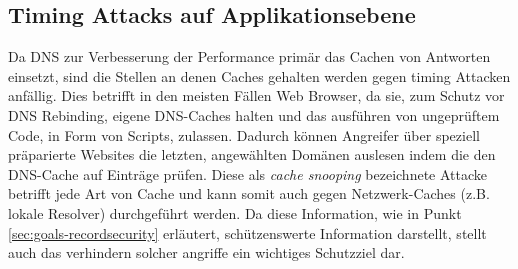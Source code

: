 \subsection{Timing Attacks auf Applikationsebene}
Da DNS zur Verbesserung der Performance primär das Cachen von Antworten einsetzt, sind die Stellen an denen Caches gehalten werden gegen timing Attacken anfällig. Dies betrifft in den meisten Fällen Web Browser, da sie, zum Schutz vor DNS Rebinding, eigene DNS-Caches halten und das ausführen von ungeprüftem Code, in Form von Scripts, zulassen. Dadurch können Angreifer über speziell präparierte Websites die letzten, angewählten Domänen auslesen indem die den DNS-Cache auf Einträge prüfen. Diese als \textit{cache snooping} bezeichnete Attacke betrifft jede Art von Cache und kann somit auch gegen Netzwerk-Caches (z.B. lokale Resolver) durchgeführt werden. Da diese Information, wie in Punkt \ref{sec:goals-recordsecurity} erläutert, schützenswerte Information darstellt, stellt auch das verhindern solcher angriffe ein wichtiges Schutzziel dar.
